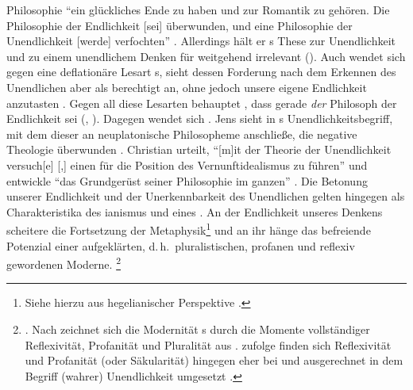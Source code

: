 {Philosophie \enquote{ein glückliches Ende zu haben und zur Romantik zu gehören. Die
Philosophie der Endlichkeit [sei] überwunden, und eine Philosophie der
Unendlichkeit [werde] verfochten}
\parencite[][117]{Pippin:KantischeTragoedieundHegelscheRomantik2004}.
Allerdings hält er s These zur Unendlichkeit und zu einem
unendlichem Denken für weitgehend irrelevant
(\cite[vgl.][128]{Pippin:KantischeTragoedieundHegelscheRomantik2004}). Auch
 wendet sich gegen eine deflationäre Lesart
s, sieht dessen Forderung nach dem Erkennen des Unendlichen aber als berechtigt an, ohne jedoch unsere
eigene Endlichkeit anzutasten
\parencite[vgl.][171--175]{Fulda:HegelsBegriffdesabsolutenGeistes2001}. Gegen
all diese Lesarten behauptet , dass gerade
 \emph{der} Philosoph der Endlichkeit sei
\mkbibparens{\cite[vgl.][98]{Stekeler-Weithofer:TheQuestionofSystem2006},
\cite[ähnlich][]{Chiereghin:WozuHegelineinemZeitalterderEndlichkeit?1998}}.
Dagegen wendet sich \cite[][]{Philipsen:NichtsalsKontexte2000}.
Jens  sieht in
s Unendlichkeitsbegriff, mit dem dieser an neuplatonische
Philosopheme anschließe, die negative Theologie überwunden
\parencite[vgl.][30,~78--83]{Halfwassen:HegelundderspaetantikeNeuplatonismus1999}.
Christian  urteilt, \enquote{[m]it der Theorie
der Unendlichkeit versuch[e] [,] einen  für die Position
des Vernunftidealismus zu führen}
\parencite[][155]{Iber:SubjektivitaetVernunftundihreKritik1999} und entwickle
\enquote{das Grundgerüst seiner Philosophie im ganzen}
\parencite[][156]{Iber:SubjektivitaetVernunftundihreKritik1999}.
} Die Betonung unserer Endlichkeit und der Unerkennbarkeit des Unendlichen
gelten hingegen als Charakteristika des ianismus und eines
. An der Endlichkeit unseres Denkens scheitere die
Fortsetzung der Metaphysik\footnote{Siehe hierzu aus hegelianischer Perspektive
\cite{Bartuschat:HegelsneueMetaphysik2007}.} und an ihr hänge das befreiende
Potenzial einer aufgeklärten, d.\,h.\  pluralistischen, profanen und reflexiv
gewordenen Moderne.%
\footnote{\cite[Vgl.][]{Schnaedelbach:WirKantianer2005}. Nach 
zeichnet sich die Modernität s durch die Momente
vollständiger Reflexivität, Profanität und Pluralität aus
\parencite[vgl.][838--843]{Schnaedelbach:WirKantianer2005}.
 zufolge finden sich Reflexivität
und Profanität (oder Säkularität) hingegen eher bei
 und ausgerechnet in dem Begriff (wahrer)
Unendlichkeit umgesetzt \parencite[vgl.][]{Jaeschke:DasabsoluteWissen2004}.}

